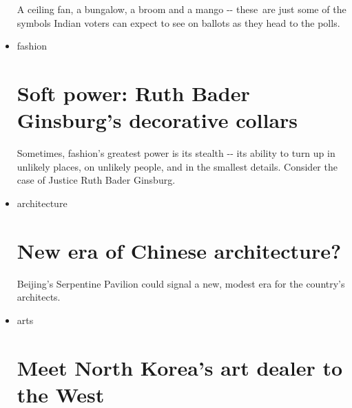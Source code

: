 \begin{itemize}
  \href{/style/article/india-election-party-symbols/index.html}{}

  A ceiling fan, a bungalow, a broom and a mango -\/- these~are just
  some of the symbols Indian voters can expect to see on ballots as they
  head to the polls.
\item
  \href{/style/fashion}{}

  fashion

  \href{/style/article/ruth-bader-ginsburg-collars/index.html}{}

  \hypertarget{soft-power-ruth-bader-ginsburgs-decorative-collars}{%
  \section{Soft power: Ruth Bader Ginsburg's decorative
  collars}\label{soft-power-ruth-bader-ginsburgs-decorative-collars}}

  \href{/style/article/ruth-bader-ginsburg-collars/index.html}{}

  Sometimes, fashion's greatest power is its stealth -\/- its ability to
  turn up in unlikely places, on unlikely people, and in the smallest
  details. Consider the case of Justice Ruth Bader Ginsburg.
\item
  \href{/style/architecture}{}

  architecture

  \href{/style/article/serpentine-pavilion-beijing-jiakun-architects/index.html}{}

  \hypertarget{new-era-of-chinese-architecture}{%
  \section{New era of Chinese
  architecture?}\label{new-era-of-chinese-architecture}}

  \href{/style/article/serpentine-pavilion-beijing-jiakun-architects/index.html}{}

  Beijing's Serpentine Pavilion could signal a new, modest era for the
  country's architects.
\item
  \href{/style/arts}{}

  arts

  \href{/style/article/north-korea-art-dealer-pier-luigi-cecioni/index.html}{}

  \hypertarget{meet-north-koreas-art-dealer-to-the-west}{%
  \section{Meet North Korea's art dealer to the
  West}\label{meet-north-koreas-art-dealer-to-the-west}}


\end{itemize}
